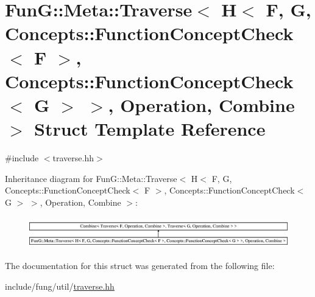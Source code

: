 \hypertarget{structFunG_1_1Meta_1_1Traverse_3_01H_3_01F_00_01G_00_01Concepts_1_1FunctionConceptCheck_3_01F_013370ce68fd07becd92320937a020c699}{\section{Fun\-G\-:\-:Meta\-:\-:Traverse$<$ H$<$ F, G, Concepts\-:\-:Function\-Concept\-Check$<$ F $>$, Concepts\-:\-:Function\-Concept\-Check$<$ G $>$ $>$, Operation, Combine $>$ Struct Template Reference}
\label{structFunG_1_1Meta_1_1Traverse_3_01H_3_01F_00_01G_00_01Concepts_1_1FunctionConceptCheck_3_01F_013370ce68fd07becd92320937a020c699}
}


{\ttfamily \#include $<$traverse.\-hh$>$}

Inheritance diagram for Fun\-G\-:\-:Meta\-:\-:Traverse$<$ H$<$ F, G, Concepts\-:\-:Function\-Concept\-Check$<$ F $>$, Concepts\-:\-:Function\-Concept\-Check$<$ G $>$ $>$, Operation, Combine $>$\-:\begin{figure}[H]
\begin{center}
\leavevmode
\includegraphics[height=1.377614cm]{structFunG_1_1Meta_1_1Traverse_3_01H_3_01F_00_01G_00_01Concepts_1_1FunctionConceptCheck_3_01F_013370ce68fd07becd92320937a020c699}
\end{center}
\end{figure}


The documentation for this struct was generated from the following file\-:\begin{DoxyCompactItemize}
\item 
include/fung/util/\hyperlink{traverse_8hh}{traverse.\-hh}\end{DoxyCompactItemize}
